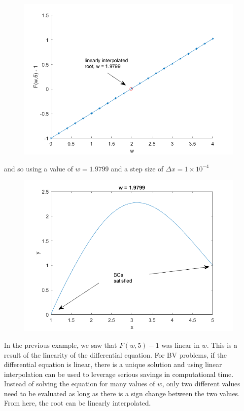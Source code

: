 \documentclass[]{article}
\theoremstyle{definition}
\numberwithin{equation}{section}
\begin{document}
	\begin{figure}[H]
	\centering
	\includegraphics[scale=.7]{ex9_2_fig.png} 
	\label{fig:ex9_2}
\end{figure}
and so using a value of $w = 1.9799$ and a step size of $\Delta x = 1 \times 10^{-4}$
	\begin{figure}[H]
	\centering
	\includegraphics[scale=.7]{ex9_3_fig.png} 
	\label{fig:ex9_3}
\end{figure}

In the previous example, we saw that $F(w,5)-1$ was linear in $w$. This is a result of the linearity of the differential equation. For BV problems, if the differential equation is linear, there is a unique solution and using linear interpolation can be used to leverage serious savings in computational time. Instead of solving the equation for many values of $w$, only two different values need to be evaluated as long as there is a sign change between the two values. From here, the root can be linearly interpolated.
\end{document}
